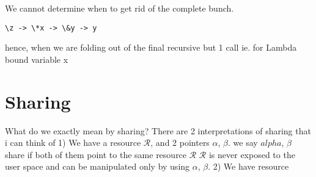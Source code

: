 We cannot determine when to get rid of the complete bunch.
\begin{verbatim}
\z -> \*x -> \&y -> y
\end{verbatim}
hence, when we are folding out of the final recursive but 1 call ie. for Lambda bound variable x

\section{Sharing}
What do we exactly mean by sharing?
There are 2 interpretations of sharing that i can think of
1) We have a resource $\mathcal{R}$, and 2 pointers $\alpha$, $\beta$. we say $alpha$, $\beta$ share if both of them point to the same resource $\mathcal{R}$
$\mathcal{R}$ is never exposed to the user space and can be manipulated only by using $\alpha$, $\beta$.
2) We have resource 


 